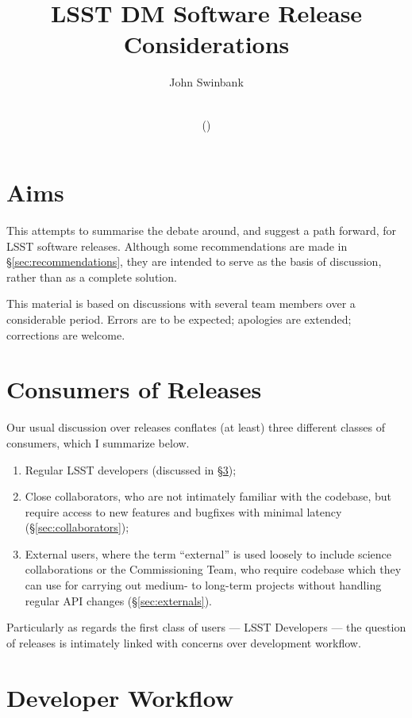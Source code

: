 \documentclass[letterpaper]{scrartcl}
\title{LSST DM Software Release Considerations}
\author{John Swinbank}
\date{\vcsdate\\\small{(\texttt{\vcsrevision})}}
\begin{document}
\maketitle

\section{Aims}

This attempts to summarise the debate around, and suggest a path forward, for
LSST software releases. Although some recommendations are made in
\S\ref{sec:recommendations}, they are intended to serve as the basis of discussion,
rather than as a complete solution.

This material is based on discussions with several team members over a
considerable period. Errors are to be expected; apologies are extended;
corrections are welcome.

\section{Consumers of Releases}

Our usual discussion over releases conflates (at least) three different
classes of consumers, which I summarize below.

\begin{enumerate}

\item{Regular LSST developers (discussed in \S\ref{sec:workflow});}

\item{Close collaborators, who are not intimately familiar with the codebase,
but require access to new features and bugfixes with minimal latency
(\S\ref{sec:collaborators});}

\item{External users, where the term ``external'' is used loosely to include
science collaborations or the Commissioning Team, who require codebase which
they can use for carrying out medium- to long-term projects without handling
regular API changes (\S\ref{sec:externals}).}

\end{enumerate}

Particularly as regards the first class of users --- LSST Developers --- the
question of releases is intimately linked with concerns over development
workflow.

\section{Developer Workflow}
\label{sec:workflow}
\end{document}
